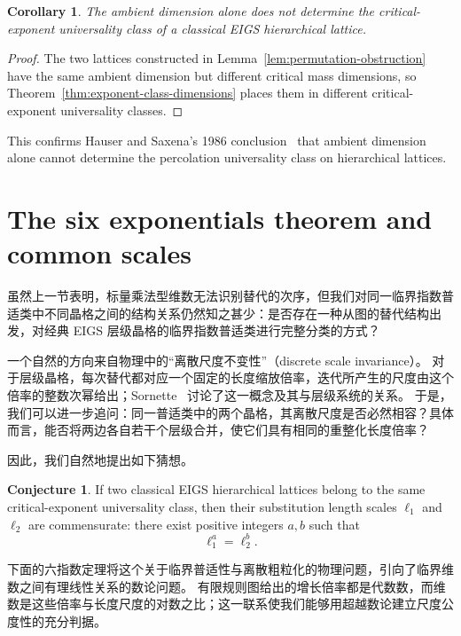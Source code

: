 \documentclass[scheme=plain,11pt]{ctexart}
\newtheorem{corollary}[theorem]{Corollary}
\theoremstyle{definition}
\newtheorem{conjecture}[theorem]{Conjecture}
\theoremstyle{remark}
\begin{document}
\begin{corollary}\label{cor:ambient-does-not-classify}
The ambient dimension alone does not determine the critical-exponent universality class of a classical EIGS hierarchical lattice.
\end{corollary}
\begin{proof}
The two lattices constructed in Lemma~\ref{lem:permutation-obstruction} have the same ambient dimension but different critical mass dimensions, so Theorem~\ref{thm:exponent-class-dimensions} places them in different critical-exponent universality classes.
\end{proof}

This confirms Hauser and Saxena's 1986 conclusion~\cite{hauser1986geometrical} that ambient dimension alone cannot determine the percolation universality class on hierarchical lattices.












\section{The six exponentials theorem and common scales}\label{sec:scale}
虽然上一节表明，标量乘法型维数无法识别替代的次序，但我们对同一临界指数普适类中不同晶格之间的结构关系仍然知之甚少：是否存在一种从图的替代结构出发，对经典 EIGS 层级晶格的临界指数普适类进行完整分类的方式？

一个自然的方向来自物理中的“离散尺度不变性”（discrete scale invariance）。
对于层级晶格，每次替代都对应一个固定的长度缩放倍率，迭代所产生的尺度由这个倍率的整数次幂给出；Sornette~\cite{sornette1998discrete} 讨论了这一概念及其与层级系统的关系。
于是，我们可以进一步追问：同一普适类中的两个晶格，其离散尺度是否必然相容？具体而言，能否将两边各自若干个层级合并，使它们具有相同的重整化长度倍率？

因此，我们自然地提出如下猜想。
\begin{conjecture}\label{conj:scale-commensurability}
If two classical EIGS hierarchical lattices belong to the same critical-exponent universality class, then their substitution length scales $\ell_1$ and $\ell_2$ are commensurate: there exist positive integers $a,b$ such that
\[
\ell_1^a=\ell_2^b.
\]
\end{conjecture}

下面的六指数定理将这个关于临界普适性与离散粗粒化的物理问题，引向了临界维数之间有理线性关系的数论问题。
有限规则图给出的增长倍率都是代数数，而维数是这些倍率与长度尺度的对数之比；这一联系使我们能够用超越数论建立尺度公度性的充分判据。
\end{document}
